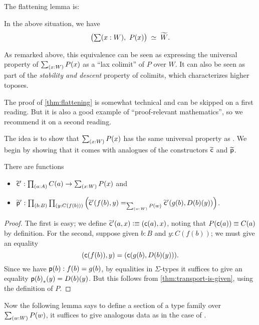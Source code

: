 The flattening lemma is:

\begin{lem}\label{thm:flattening}
  In the above situation, we have
  \[ \big(\sm{x:W} P(x)\big) \;\simeq\; \widetilde{W}. \]
\end{lem}

As remarked above, this equivalence can be seen as expressing the universal property of $\sm{x:W} P(x)$ as a ``lax colimit'' of $P$ over $W$.
It can also be seen as part of the \emph{stability and descent} property of colimits, which characterizes higher toposes.

The proof of \autoref{thm:flattening} is somewhat technical and can be skipped on a first reading.
But it is also a good example of ``proof-relevant mathematics'', so we recommend it on a second reading.

The idea is to show that $\sm{x:W} P(x)$ has the same universal property as \Wtil.
We begin by showing that it comes with analogues of the constructors $\widetilde{\mathsf{c}}$ and $\widetilde{\mathsf{p}}$.

\begin{lem}
  There are functions
  \begin{itemize}
  \item $\cct':\prd{a:A} C(a) \to \sm{x:W} P(x)$ and
  \item $\ppt':\prd{b:B}{y:C(f(b))} \Big(\cct'(f(b),y)=_{\sm{w:W}P(w)}\cct'(g(b),D(b)(y))\Big)$.
  \end{itemize}
\end{lem}
\begin{proof}
  The first is easy; we define $\widetilde{\mathsf{c}}'(a,x) \vcentcolon\equiv (\mathsf{c}(a),x)$, noting that $P(\mathsf{c}(a))\equiv C(a)$ by definition.
  For the second, suppose given $b:B$ and $y:C(f(b))$; we must give an equality
  \[ (\mathsf{c}(f(b)),y) = (\mathsf{c}(g(b),D(b)(y))). \]
  Since we have $\mathsf{p}(b):f(b)=g(b)$, by equalities in $\Sigma$-types it suffices to give an equality ${\mathsf{p}(b)}_{*}({y}) = D(b)(y)$.
  But this follows from \autoref{thm:transport-is-given}, using the definition of $P$.
\end{proof}

Now the following lemma says to define a section of a type family over $\sm{w:W} P(w)$, it suffices to give analogous data as in the case of \Wtil.

